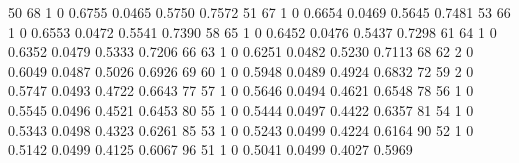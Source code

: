 \documentclass[
  12pt,
  letterpaper,
  DIV=11,
  numbers=noendperiod,
  onepage,
  openany]{scrreprt}
\newenvironment{Shaded}{\begin{snugshade}}{\end{snugshade}}
\newcommand{\DecValTok}[1]{\textcolor[rgb]{0.86,0.86,0.80}{#1}}
\newcommand{\FloatTok}[1]{\textcolor[rgb]{0.75,0.75,0.82}{#1}}
\begin{document}
\begin{Shaded}
\begin{Highlighting}[]
    \DecValTok{50}       \DecValTok{68}      \DecValTok{1}      \DecValTok{0}             \FloatTok{0.6755}    \FloatTok{0.0465}     \FloatTok{0.5750}    \FloatTok{0.7572}
    \DecValTok{51}       \DecValTok{67}      \DecValTok{1}      \DecValTok{0}             \FloatTok{0.6654}    \FloatTok{0.0469}     \FloatTok{0.5645}    \FloatTok{0.7481}
    \DecValTok{53}       \DecValTok{66}      \DecValTok{1}      \DecValTok{0}             \FloatTok{0.6553}    \FloatTok{0.0472}     \FloatTok{0.5541}    \FloatTok{0.7390}
    \DecValTok{58}       \DecValTok{65}      \DecValTok{1}      \DecValTok{0}             \FloatTok{0.6452}    \FloatTok{0.0476}     \FloatTok{0.5437}    \FloatTok{0.7298}
    \DecValTok{61}       \DecValTok{64}      \DecValTok{1}      \DecValTok{0}             \FloatTok{0.6352}    \FloatTok{0.0479}     \FloatTok{0.5333}    \FloatTok{0.7206}
    \DecValTok{66}       \DecValTok{63}      \DecValTok{1}      \DecValTok{0}             \FloatTok{0.6251}    \FloatTok{0.0482}     \FloatTok{0.5230}    \FloatTok{0.7113}
    \DecValTok{68}       \DecValTok{62}      \DecValTok{2}      \DecValTok{0}             \FloatTok{0.6049}    \FloatTok{0.0487}     \FloatTok{0.5026}    \FloatTok{0.6926}
    \DecValTok{69}       \DecValTok{60}      \DecValTok{1}      \DecValTok{0}             \FloatTok{0.5948}    \FloatTok{0.0489}     \FloatTok{0.4924}    \FloatTok{0.6832}
    \DecValTok{72}       \DecValTok{59}      \DecValTok{2}      \DecValTok{0}             \FloatTok{0.5747}    \FloatTok{0.0493}     \FloatTok{0.4722}    \FloatTok{0.6643}
    \DecValTok{77}       \DecValTok{57}      \DecValTok{1}      \DecValTok{0}             \FloatTok{0.5646}    \FloatTok{0.0494}     \FloatTok{0.4621}    \FloatTok{0.6548}
    \DecValTok{78}       \DecValTok{56}      \DecValTok{1}      \DecValTok{0}             \FloatTok{0.5545}    \FloatTok{0.0496}     \FloatTok{0.4521}    \FloatTok{0.6453}
    \DecValTok{80}       \DecValTok{55}      \DecValTok{1}      \DecValTok{0}             \FloatTok{0.5444}    \FloatTok{0.0497}     \FloatTok{0.4422}    \FloatTok{0.6357}
    \DecValTok{81}       \DecValTok{54}      \DecValTok{1}      \DecValTok{0}             \FloatTok{0.5343}    \FloatTok{0.0498}     \FloatTok{0.4323}    \FloatTok{0.6261}
    \DecValTok{85}       \DecValTok{53}      \DecValTok{1}      \DecValTok{0}             \FloatTok{0.5243}    \FloatTok{0.0499}     \FloatTok{0.4224}    \FloatTok{0.6164}
    \DecValTok{90}       \DecValTok{52}      \DecValTok{1}      \DecValTok{0}             \FloatTok{0.5142}    \FloatTok{0.0499}     \FloatTok{0.4125}    \FloatTok{0.6067}
    \DecValTok{96}       \DecValTok{51}      \DecValTok{1}      \DecValTok{0}             \FloatTok{0.5041}    \FloatTok{0.0499}     \FloatTok{0.4027}    \FloatTok{0.5969}

\end{Highlighting}
\end{Shaded}
\end{document}
